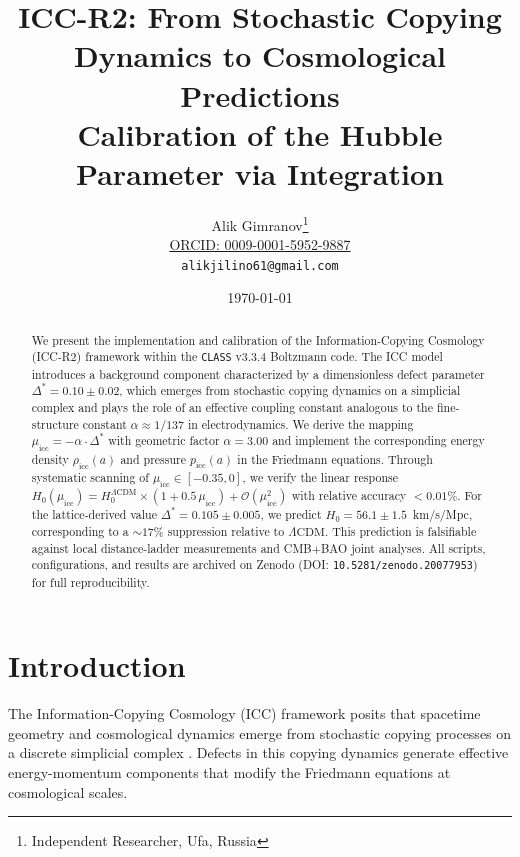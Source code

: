 \documentclass[11pt,a4paper]{article}
\title{
    \textbf{ICC-R2: From Stochastic Copying Dynamics to Cosmological Predictions} \\
    \large Calibration of the Hubble Parameter via \class{} Integration
}
\author{
    Alik Gimranov\thanks{Independent Researcher, Ufa, Russia} \\
    \href{https://orcid.org/0009-0001-5952-9887}{ORCID: 0009-0001-5952-9887} \\
    \texttt{alikjilino61@gmail.com}
}
\date{\today}
\newcommand{\lcdm}{\Lambda\mathrm{CDM}}
\newcommand{\DeltaStar}{\Delta^{\ast}}
\newcommand{\muicc}{\mu_{\mathrm{icc}}}
\newcommand{\class}{\texttt{CLASS}}
\newcommand{\zenodoDOIvOneOne}{10.5281/zenodo.20077953}   %
\begin{document}
\maketitle

\begin{abstract}
\noindent
We present the implementation and calibration of the Information-Copying Cosmology (ICC-R2) framework within the \class{} v3.3.4 Boltzmann code. The ICC model introduces a background component characterized by a dimensionless defect parameter $\DeltaStar = 0.10 \pm 0.02$, which emerges from stochastic copying dynamics on a simplicial complex and plays the role of an effective coupling constant analogous to the fine-structure constant $\alpha \approx 1/137$ in electrodynamics. We derive the mapping $\muicc = -\alpha \cdot \DeltaStar$ with geometric factor $\alpha = 3.00$ and implement the corresponding energy density $\rho_{\text{icc}}(a)$ and pressure $p_{\text{icc}}(a)$ in the Friedmann equations. Through systematic scanning of $\muicc \in [-0.35, 0]$, we verify the linear response $H_0(\muicc) = H_0^{\lcdm} \times (1 + 0.5\,\muicc) + \mathcal{O}(\muicc^2)$ with relative accuracy $< 0.01\%$. For the lattice-derived value $\DeltaStar = 0.105 \pm 0.005$, we predict $H_0 = 56.1 \pm 1.5$~km/s/Mpc, corresponding to a $\sim 17\%$ suppression relative to $\lcdm$. This prediction is falsifiable against local distance-ladder measurements and CMB+BAO joint analyses. All scripts, configurations, and results are archived on Zenodo (DOI: \texttt{\zenodoDOIvOneOne}) for full reproducibility.
\end{abstract}

\section{Introduction}
\label{sec:intro}

The Information-Copying Cosmology (ICC) framework posits that spacetime geometry and cosmological dynamics emerge from stochastic copying processes on a discrete simplicial complex \cite{gimranov2025icc}. Defects in this copying dynamics generate effective energy-momentum components that modify the Friedmann equations at cosmological scales.
\end{document}
